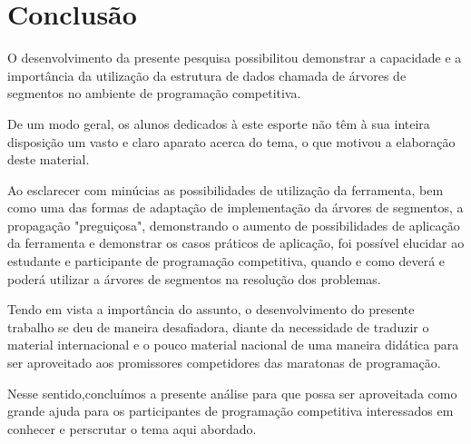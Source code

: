 \chapter{Conclusão}
\label{cap:conclusao}

O desenvolvimento da presente pesquisa possibilitou demonstrar a capacidade e a importância da utilização da estrutura de dados chamada de árvores de segmentos no ambiente de programação competitiva.

De um modo geral, os alunos dedicados à este esporte não têm à sua inteira disposição um vasto e claro aparato acerca do tema, o que motivou a elaboração deste material.

Ao esclarecer com minúcias as possibilidades de utilização da ferramenta, bem como uma das formas de adaptação de implementação da árvores de segmentos, a propagação "preguiçosa", demonstrando o aumento de possibilidades de aplicação da ferramenta e demonstrar os casos práticos de aplicação, foi possível elucidar ao estudante e participante de programação competitiva, quando e como deverá e poderá utilizar a árvores de segmentos na resolução dos problemas.
 
Tendo em vista a importância do assunto, o desenvolvimento do presente trabalho se deu de maneira desafiadora, diante da necessidade de traduzir o material internacional e o pouco material nacional de uma maneira didática para ser aproveitado aos promissores competidores das maratonas de programação.

Nesse sentido,concluímos a presente análise para que possa ser aproveitada como grande ajuda para os participantes de programação competitiva interessados em conhecer e perscrutar o tema aqui abordado.



